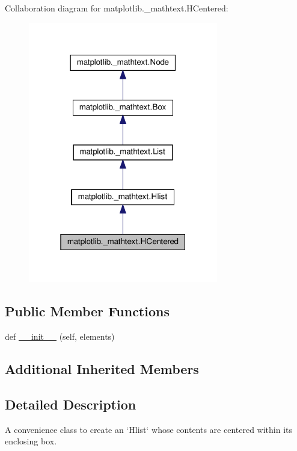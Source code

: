 Collaboration diagram for matplotlib.\+\_\+mathtext.\+H\+Centered\+:
\nopagebreak
\begin{figure}[H]
\begin{center}
\leavevmode
\includegraphics[width=235pt]{classmatplotlib_1_1__mathtext_1_1HCentered__coll__graph}
\end{center}
\end{figure}
\subsection*{Public Member Functions}
\begin{DoxyCompactItemize}
\item 
def \hyperlink{classmatplotlib_1_1__mathtext_1_1HCentered_a7485f1fcd6e560851576445c64633e37}{\+\_\+\+\_\+init\+\_\+\+\_\+} (self, elements)
\end{DoxyCompactItemize}
\subsection*{Additional Inherited Members}


\subsection{Detailed Description}
\begin{DoxyVerb}A convenience class to create an `Hlist` whose contents are
centered within its enclosing box.
\end{DoxyVerb}
 

